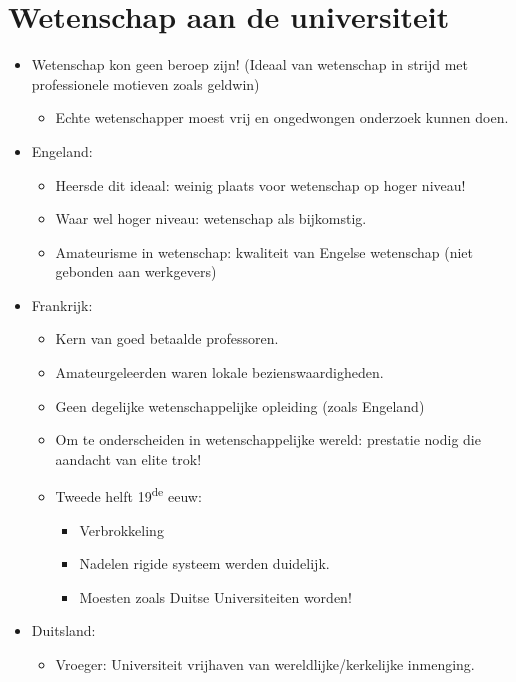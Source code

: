 \documentclass{article}
\begin{document}
  \section{Wetenschap aan de universiteit}
    \begin{itemize}
      \item Wetenschap kon geen beroep zijn! (Ideaal van wetenschap in strijd met professionele motieven zoals geldwin)
      \begin{itemize}
        \item Echte wetenschapper moest vrij en ongedwongen onderzoek kunnen doen.
      \end{itemize}
      \item Engeland:
      \begin{itemize}
        \item Heersde dit ideaal: weinig plaats voor wetenschap op hoger niveau!
        \item Waar wel hoger niveau: wetenschap als bijkomstig.
        \item Amateurisme in wetenschap: kwaliteit van Engelse wetenschap (niet gebonden aan werkgevers)
      \end{itemize}
      \item Frankrijk:
      \begin{itemize}
        \item Kern van goed betaalde professoren.
        \item Amateurgeleerden waren lokale bezienswaardigheden.
        \item Geen degelijke wetenschappelijke opleiding (zoals Engeland)
        \item Om te onderscheiden in wetenschappelijke wereld: prestatie nodig die aandacht van elite trok!
        \item Tweede helft 19\textsuperscript{de} eeuw:
        \begin{itemize}
          \item Verbrokkeling
          \item Nadelen rigide systeem werden duidelijk.
          \item Moesten zoals Duitse Universiteiten worden!
        \end{itemize}
      \end{itemize}
      \item Duitsland:
      \begin{itemize}
        \item Vroeger: Universiteit vrijhaven van wereldlijke/kerkelijke inmenging.

\end{itemize}
\end{itemize}
\end{document}
